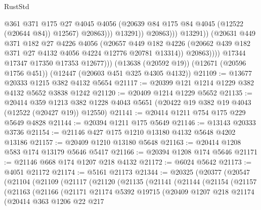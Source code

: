 \begin{lexlean}{RustStd}
\begin{coremodule}
                                    @361
                                    @371
                                    @175
                                    @27
                                    @4045
                                    @4056
                                    (@20639 @84 @175 @84 @4045 (@12522 (@20644 @84)) @12567)
                                    @20863)))
                              @13291))
                          @20863)))
                    @13291))
                (@20631
                  @449
                  @371
                  @182
                  @27
                  @4226
                  @4056
                  (@20657
                    @449
                    @182
                    @4226
                    (@20662 @439 @182 @371 @27 @4132 @4056 @4224 @12776 @20781 @13314))
                  @20863))))
          @17344
          @17347
          @17350
          @17353
          @12677)))
    (@13638 (@20592 @19))
    (@12671 (@20596 @1756 @451))
    (@12447 (@20603 @451 @325 @4305 @4132))
@21109 := @13677 @20333 @1215 @382 @4132 @5654
@21117 := @20399 @121 @1214 @1229 @382 @4132 @5652 @3838 @1242
@21120 := @20409 @1214 @1229 @5652
@21135 := @20414
    @359
    @1213
    @382
    @1228
    @4043
    @5651
    (@20422 @19 @382 @19 @4043 (@12522 (@20427 @19)) @12550)
@21141 := @20414 @1211 @754 @175 @229 @5649 @4828
@21144 := @20394 @1211 @175 @5649
@21146 := @13143 @20333 @3736
@21154 := @21146 @427 @175 @1210 @13180 @4132 @5648 @4202 @13186
@21157 := @20409 @1210 @13180 @5648
@21163 := @20414 @1208 @583 @174 @13179 @5646 @5417
@21166 := @20394 @1208 @174 @5646
@21171 := @21146 @668 @174 @1207 @218 @4132
@21172 := @6024 @5642
@21173 := @4051 @21172
@21174 := @5161 @21173
@21344 := @20325
    (@20377
      (@20547
        (@21104
          (@21109
            (@21117
              (@21120
                (@21135
                  (@21141
                    (@21144
                      (@21154
                        (@21157
                          (@21163
                            (@21166
                              (@21171
                                @21174
                                @5392
                                @19715
                                (@20409
                                  @1207
                                  @218
                                  @21174
                                  (@20414
                                    @363
                                    @1206
                                    @22
                                    @217

\end{coremodule}
\end{lexlean}
